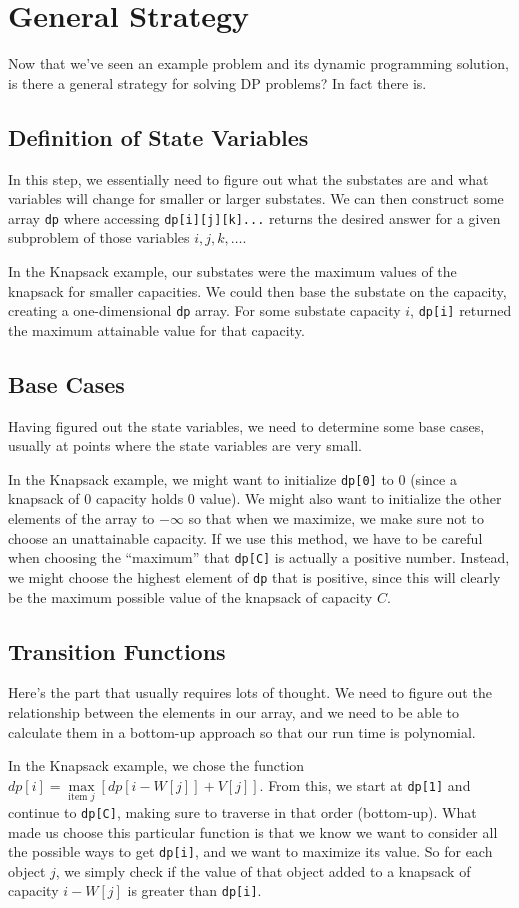 \section{General Strategy}
Now that we've seen an example problem and its dynamic programming solution, is there a general strategy for solving DP problems?  In fact there is.
%
\subsection{Definition of State Variables}
In this step, we essentially need to figure out what the substates are and what variables will change for smaller or larger substates.  We can then construct some array \verb=dp= where accessing \verb=dp[i][j][k]...= returns the desired answer for a given subproblem of those variables $i, j, k, \ldots$.

In the Knapsack example, our substates were the maximum values of the knapsack for smaller capacities.  We could then base the substate on the capacity, creating a one-dimensional \verb=dp= array.  For some substate capacity $i$, \verb=dp[i]= returned the maximum attainable value for that capacity.
%
\subsection{Base Cases}
Having figured out the state variables, we need to determine some base cases, usually at points where the state variables are very small.

In the Knapsack example, we might want to initialize \verb=dp[0]= to $0$ (since a knapsack of $0$ capacity holds $0$ value).  We might also want to initialize the other elements of the array to $-\infty$ so that when we maximize, we make sure not to choose an unattainable capacity.  If we use this method, we have to be careful when choosing the ``maximum'' that \verb=dp[C]= is actually a positive number.  Instead, we might choose the highest element of \verb=dp= that is positive, since this will clearly be the maximum possible value of the knapsack of capacity $C$.
%
\subsection{Transition Functions}
Here's the part that usually requires lots of thought.  We need to figure out the relationship between the elements in our array, and we need to be able to calculate them in a bottom-up approach so that our run time is polynomial.

In the Knapsack example, we chose the function $dp[i] = \max\limits_{\text{item } j} \left[dp[i-W[j]]+V[j]\right]$.  From this, we start at \verb=dp[1]= and continue to \verb=dp[C]=, making sure to traverse in that order (bottom-up).  What made us choose this particular function is that we know we want to consider all the possible ways to get \verb=dp[i]=, and we want to maximize its value.  So for each object $j$, we simply check if the value of that object added to a knapsack of capacity $i-W[j]$ is greater than \verb=dp[i]=.
